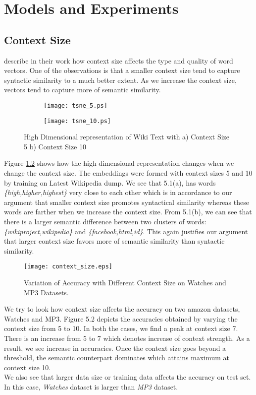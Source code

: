 \chapter{Models and Experiments}
\label{sec:experiment}
\section{Context Size}
\cite{Mikolov:13a} describe in their work how context size affects the type and quality of word vectors. One of the observations is that a smaller context size tend to capture syntactic similarity to a much better extent. As we increase the context size, vectors tend to capture more of semantic similarity.
\begin{figure}[]
	\centering
	\begin{subfigure}{\linewidth}
	\texttt{[image: tsne\_5.ps]}
	\caption{}
	\label{fig:5K_hindi_zoom1}
	\end{subfigure}
	\newline
	\begin{subfigure}{\linewidth}
	\texttt{[image: tsne\_10.ps]}
	\caption{}
	\end{subfigure}
	\newline
	\caption{High Dimensional representation of Wiki Text with a) Context Size 5 b) Context Size 10}
	\label{fig:tsne_5_10}
\end{figure}

Figure \ref{fig:tsne_5_10} shows how the high dimensional representation changes when we change the context size. The embeddings were formed with context sizes 5 and 10 by training on Latest Wikipedia dump. We see that 5.1(a), has words \emph{\{high,higher,highest\}} very close to each other which is in accordance to our argument that smaller context size promotes syntactical similarity whereas these words are farther when we increase the context size. From 5.1(b), we can see that there is a larger semantic difference between two clusters of words:\emph{\{wikiproject,wikipedia\}} and \emph{\{facebook,html,id\}}. This again justifies our argument that larger context size favors more of semantic similarity than syntactic similarity.

\begin{figure}[ht!]
\centering
\texttt{[image: context\_size.eps]}
\caption{Variation of Accuracy with Different Context Size on Watches and MP3 Datasets. \label{fig:context_size}}
\end{figure}
We try to look how context size affects the accuracy on two amazon datasets, Watches and MP3.
Figure 5.2 depicts the accuracies obtained by varying the context size from 5 to 10. In both the cases, we find a peak at context size 7. There is an increase from 5 to 7 which denotes increase of context strength. As a result, we see increase in accuracies. Once the context size goes beyond a threshold, the semantic counterpart dominates which attains maximum at context size 10.\\
We also see that larger data size or training data affects the accuracy on test set. In this case, \emph{Watches} dataset is larger than \emph{MP3} dataset.\\


